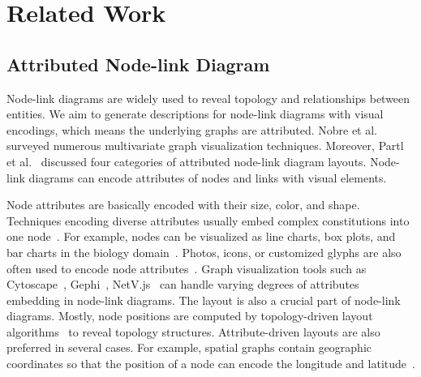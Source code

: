 \section{Related Work}\label{sec:relatedwork}
\subsection{Attributed Node-link Diagram}
Node-link diagrams are widely used to reveal topology and relationships between entities.
We aim to generate descriptions for node-link diagrams with visual encodings, which means the underlying graphs are attributed.
Nobre et al.~\cite{DBLP:journals/cgf/NobreMSL19} surveyed numerous multivariate graph visualization techniques.
Moreover, Partl et al.~\cite{DBLP:conf/biovis/PartlKLKSS12} discussed four categories of attributed node-link diagram layouts.
Node-link diagrams can encode attributes of nodes and links with visual elements.

Node attributes are basically encoded with their size, color, and shape.
Techniques encoding diverse attributes usually embed complex constitutions into one node~\cite{DBLP:conf/infovis/AuberCJM03}.
For example, nodes can be visualized as line charts, box plots, and bar charts in the biology domain~\cite{gehlenborg2010visualization, DBLP:conf/iv/JusufiDK10}.
Photos, icons, or customized glyphs are also often used to encode node attributes~\cite{DBLP:conf/chi/DunneS13}.
Graph visualization tools such as Cytoscape~\cite{DBLP:journals/bioinformatics/FranzLHDSB16}, Gephi~\cite{DBLP:conf/icwsm/BastianHJ09}, NetV.js~\cite{HAN2021} can handle varying degrees of attributes embedding in node-link diagrams.
The layout is also a crucial part of node-link diagrams.
Mostly, node positions are computed by topology-driven layout algorithms~\cite{DBLP:journals/spe/FruchtermanR91, DBLP:journals/cgf/KruigerRMKKT17, DBLP:journals/tvcg/GansnerHN13, DBLP:journals/tvcg/ZhuCHHLZ21} to reveal topology structures.
Attribute-driven layouts are also preferred in several cases.
For example, spatial graphs contain geographic coordinates so that the position of a node can encode the longitude and latitude~\cite{DBLP:journals/tvcg/ElzenW14, DBLP:journals/tvcg/Guo09}.

